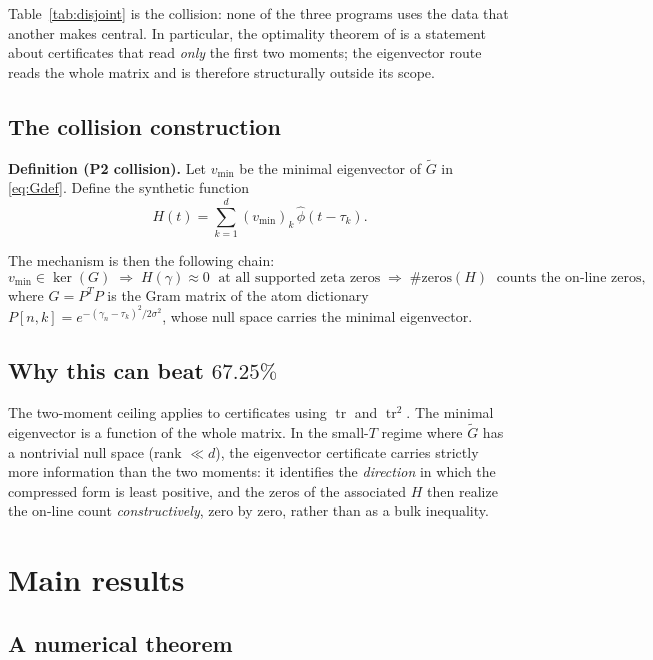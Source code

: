 \documentclass[11pt]{article}
\newcommand{\tr}{\operatorname{tr}}
\begin{document}
Table~\ref{tab:disjoint} is the collision: none of the three programs uses the data that another makes central. In particular, the optimality theorem of \cite{anthropic} is a statement about certificates that read \emph{only} the first two moments; the eigenvector route reads the whole matrix and is therefore structurally outside its scope.

\subsection{The collision construction}

\textbf{Definition (P2 collision).} Let $v_{\min}$ be the minimal eigenvector of $\tilde G$ in \eqref{eq:Gdef}. Define the synthetic function
\begin{equation}
H(t)=\sum_{k=1}^{d}(v_{\min})_k\,\hat\phi(t-\tau_k).
\label{eq:H}
\end{equation}

The mechanism is then the following chain:
\begin{equation}
v_{\min}\in\ker(G)\;\Longrightarrow\; H(\gamma)\approx 0\;\text{ at all supported zeta zeros}
\;\Longrightarrow\;\#\mathrm{zeros}(H)\;\text{ counts the on-line zeros},
\label{eq:chain}
\end{equation}
where $G=P^T P$ is the Gram matrix of the atom dictionary $P[n,k]=e^{-(\gamma_n-\tau_k)^2/2\sigma^2}$, whose null space carries the minimal eigenvector.

\subsection{Why this can beat $67.25\%$}

The two-moment ceiling applies to certificates using $\tr$ and $\tr^2$. The minimal eigenvector is a function of the whole matrix. In the small-$T$ regime where $\tilde G$ has a nontrivial null space (rank $\ll d$), the eigenvector certificate carries strictly more information than the two moments: it identifies the \emph{direction} in which the compressed form is least positive, and the zeros of the associated $H$ then realize the on-line count \emph{constructively}, zero by zero, rather than as a bulk inequality.

\section{Main results}

\subsection{A numerical theorem}
\end{document}
